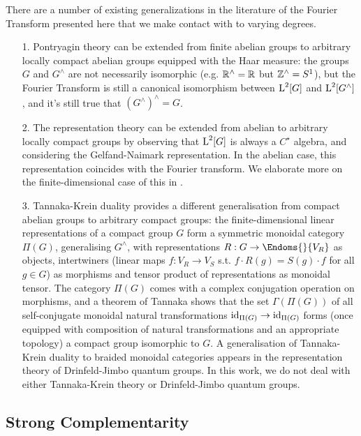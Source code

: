 There are a number of existing generalizations in the literature of the Fourier Transform presented here that we make contact with to varying degrees. 
\begin{enumerate}
\item[1.] Pontryagin theory can be extended from finite abelian groups to arbitrary locally compact abelian groups equipped with the Haar measure: the groups $G$ and $G^\wedge$ are not necessarily isomorphic (e.g. $\mathbb{R}^\wedge = \mathbb{R}$ but $\mathbb{Z}^\wedge = S^1$), but the Fourier Transform is still a canonical isomorphism between $\operatorname{L}^2[G]$ and $\operatorname{L}^2[G^\wedge]$, and it's still true that $(G^\wedge)^\wedge = G$. 

\item[2.] The representation theory can be extended from abelian to arbitrary locally compact groups by observing that $\operatorname{L}^2[G]$ is always a $C^\star$ algebra, and considering the Gelfand-Naimark representation. In the abelian case, this representation coincides with the Fourier transform. We elaborate more on the finite-dimensional case of this in . 

\item[3.]  Tannaka-Krein duality provides a different generalisation from compact abelian groups to arbitrary compact groups: the finite-dimensional linear representations of a compact group $G$ form a symmetric monoidal category $\Pi(G)$, generalising $G^\wedge$, with representations $R:G \rightarrow \Endoms{}{V_R}$ as objects, intertwiners (linear maps $f: V_R \rightarrow V_S$ s.t. $f \cdot R(g) = S(g) \cdot f$ for all $g\in G$) as morphisms and tensor product of representations as monoidal tensor. The category $\Pi(G)$ comes with a complex conjugation operation on morphisms, and a theorem of Tannaka shows that the set $\Gamma(\Pi(G))$ of all self-conjugate monoidal natural transformations $\mbox{id}_{\Pi(G)} \rightarrow \mbox{id}_{\Pi(G)}$ forms (once equipped with composition of natural transformations and an appropriate topology) a compact group isomorphic to $G$. A generalisation of Tannaka-Krein duality to braided monoidal categories appears in the representation theory of Drinfeld-Jimbo quantum groups. In this work, we do not deal with either Tannaka-Krein theory or Drinfeld-Jimbo quantum groups.
\end{enumerate}

\subsection{Strong Complementarity}
\label{sec:strcompl}

